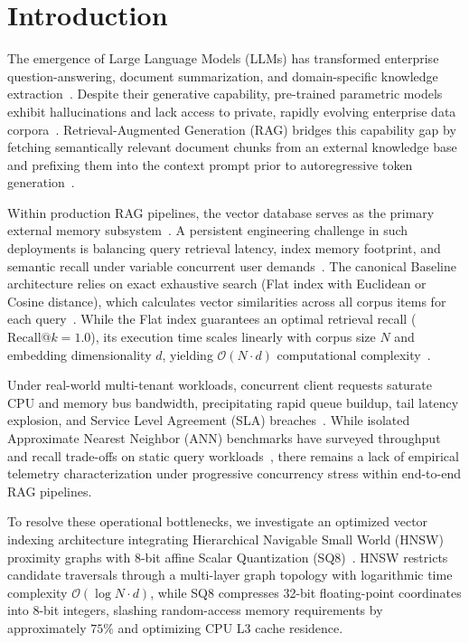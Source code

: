 \documentclass[conference]{IEEEtran}
\begin{document}
\section{Introduction}
\label{sec:intro}
The emergence of Large Language Models (LLMs) has transformed enterprise question-answering, document summarization, and domain-specific knowledge extraction~\cite{vaswani2017attention,lewis2020rag}. Despite their generative capability, pre-trained parametric models exhibit hallucinations and lack access to private, rapidly evolving enterprise data corpora~\cite{gao2023ragsurvey}. Retrieval-Augmented Generation (RAG) bridges this capability gap by fetching semantically relevant document chunks from an external knowledge base and prefixing them into the context prompt prior to autoregressive token generation~\cite{karpukhin2020dpr,guu2020realm}.

Within production RAG pipelines, the vector database serves as the primary external memory subsystem~\cite{wang2021milvus,pan2024survey}. A persistent engineering challenge in such deployments is balancing query retrieval latency, index memory footprint, and semantic recall under variable concurrent user demands~\cite{aumuller2020ann}. The canonical Baseline architecture relies on exact exhaustive search (Flat index with Euclidean or Cosine distance), which calculates vector similarities across all corpus items for each query~\cite{johnson2019billion}. While the Flat index guarantees an optimal retrieval recall ($\text{Recall}@k = 1.0$), its execution time scales linearly with corpus size $N$ and embedding dimensionality $d$, yielding $\mathcal{O}(N \cdot d)$ computational complexity~\cite{pan2024survey}.

Under real-world multi-tenant workloads, concurrent client requests saturate CPU and memory bus bandwidth, precipitating rapid queue buildup, tail latency explosion, and Service Level Agreement (SLA) breaches~\cite{gray1993benchmark}. While isolated Approximate Nearest Neighbor (ANN) benchmarks have surveyed throughput and recall trade-offs on static query workloads~\cite{aumuller2020ann}, there remains a lack of empirical telemetry characterization under progressive concurrency stress within end-to-end RAG pipelines.

To resolve these operational bottlenecks, we investigate an optimized vector indexing architecture integrating Hierarchical Navigable Small World (HNSW) proximity graphs with 8-bit affine Scalar Quantization (SQ8)~\cite{malkov2018hnsw,dettmers2022llmint8}. HNSW restricts candidate traversals through a multi-layer graph topology with logarithmic time complexity $\mathcal{O}(\log N \cdot d)$, while SQ8 compresses 32-bit floating-point coordinates into 8-bit integers, slashing random-access memory requirements by approximately $75\%$ and optimizing CPU L3 cache residence.
\end{document}
